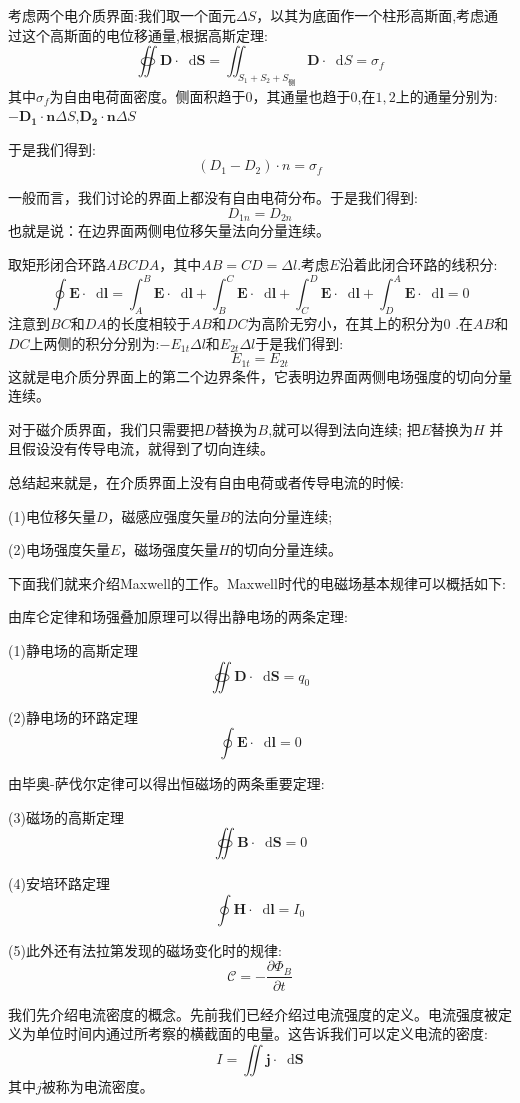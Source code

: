 \documentclass[12pt,a4paper,oneside]{report}
\theoremstyle{definition}
\theoremstyle{remark}
\newcommand{\mb}[1]{\mathbf{#1}}
\renewcommand{\d}{\mathop{}\!\mathrm{d}}
\begin{document}
考虑两个电介质界面:我们取一个面元$\Delta S$，以其为底面作一个柱形高斯面,考虑通过这个高斯面的电位移通量,根据高斯定理: 
\[
\oiint \mb{D} \cdot \d \mathbf{S} = \iint_{S_1+S_2+S_{\text{侧}}} \mathbf{D}\cdot \d S = \sigma_f
\]
其中$\sigma_f$为自由电荷面密度。侧面积趋于$0$，其通量也趋于$0$,在$1,2$上的通量分别为:$-\mb{D_1}\cdot \mb{n} \Delta S$,$\mb{D_2}\cdot \mb{n} \Delta S$

于是我们得到:
\[
(D_1-D_2) \cdot n = \sigma_f
\]

一般而言，我们讨论的界面上都没有自由电荷分布。于是我们得到:
\[
D_{1n}=D_{2n}
\]
也就是说：在边界面两侧电位移矢量法向分量连续。

取矩形闭合环路$ABCDA$，其中$AB=CD=\Delta l$.考虑$E$沿着此闭合环路的线积分:
\[
\oint \mb{E} \cdot \d \mb{l} = \int_A^B \mb{E} \cdot \d \mb{l}+ \int_B^C \mb{E} \cdot \d \mb{l}+\int_C^D \mb{E} \cdot \d \mb{l}+\int_D^A \mb{E} \cdot \d \mb{l}=0
\]
注意到$BC$和$DA$的长度相较于$AB$和$DC$为高阶无穷小，在其上的积分为$0$
.在$AB$和$DC$上两侧的积分分别为:$-E_{1t}\Delta l$和$E_{2t}\Delta l$于是我们得到:
\[
E_{1t} = E_{2t}
\]
这就是电介质分界面上的第二个边界条件，它表明边界面两侧电场强度的切向分量连续。

对于磁介质界面，我们只需要把$D$替换为$B$,就可以得到法向连续; 把$E$替换为$H$
并且假设没有传导电流，就得到了切向连续。

总结起来就是，在介质界面上没有自由电荷或者传导电流的时候:

(1)电位移矢量$D$，磁感应强度矢量$B$的法向分量连续;

(2)电场强度矢量$E$，磁场强度矢量$H$的切向分量连续。

下面我们就来介绍Maxwell的工作。Maxwell时代的电磁场基本规律可以概括如下:

由库仑定律和场强叠加原理可以得出静电场的两条定理:

(1)静电场的高斯定理
\[
\oiint \mathbf{D} \cdot \d \mathbf{S} = q_0
\]

(2)静电场的环路定理
\[
\oint \mb{E}\cdot \d \mb{l} = 0
\]

由毕奥-萨伐尔定律可以得出恒磁场的两条重要定理:

(3)磁场的高斯定理
\[
\oiint \mathbf{B} \cdot \d \mb{S} = 0
\]

(4)安培环路定理
\[
\oint \mb{H} \cdot \d \mb{l} = I_0
\]

(5)此外还有法拉第发现的磁场变化时的规律:
\[
\mathscr C = -\frac{\partial \Phi_B}{\partial t}
\]

我们先介绍电流密度的概念。先前我们已经介绍过电流强度的定义。电流强度被定义为单位时间内通过所考察的横截面的电量。这告诉我们可以定义电流的密度:
\[
I = \iint \mb{j}\cdot \d \mb{S} 
\]
其中$j$被称为电流密度。
\end{document}
